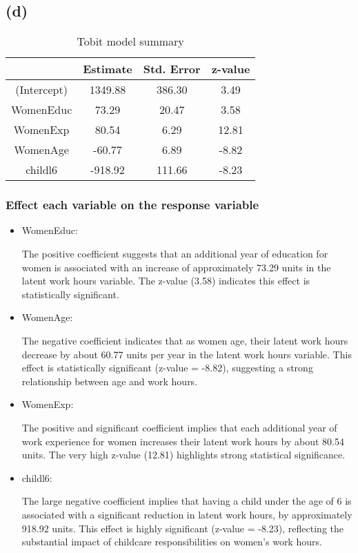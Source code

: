 \documentclass[a4paper]{article}
\begin{document}
\subsection*{(d)}

\begin{table}[h!]
    \centering
    \begin{tabular}{|cccc|}
    \hline
    \textbf{}   & \textbf{Estimate} & \textbf{Std. Error} & \textbf{z-value} \\ \hline
     (Intercept) &     1349.88    &     386.30      & 3.49      \\ %
     WomenEduc  &      73.29      &       20.47       & 3.58      \\ %
     WomenExp   &      80.54      &        6.29        & 12.81     \\ %
     WomenAge   &      -60.77     &       6.89       & -8.82     \\ %
     childl6    &       -918.92   &       111.66    & -8.23     \\ \hline
    \end{tabular}
    \caption{Tobit model summary}
    \label{tab:Tobit}
\end{table}

\subsubsection*{Effect each variable on the response variable}
\begin{itemize}
    \item WomenEduc: 
    
    The positive coefficient suggests that an additional year of education for women is associated with an increase of approximately 73.29 units in the latent work hours variable. The z-value (3.58) indicates this effect is statistically significant.

    \item WomenAge:

    The negative coefficient indicates that as women age, their latent work hours decrease by about 60.77 units per year in the latent work hours variable. This effect is statistically significant (z-value = -8.82), suggesting a strong relationship between age and work hours.

    \item WomenExp:
    
    The positive and significant coefficient implies that each additional year of work experience for women increases their latent work hours by about 80.54 units. The very high z-value (12.81) highlights strong statistical significance.

    \item childl6:
    
    The large negative coefficient implies that having a child under the age of 6 is associated with a significant reduction in latent work hours, by approximately 918.92 units. This effect is highly significant (z-value = -8.23), reflecting the substantial impact of childcare responsibilities on women's work hours.

\end{itemize}
\end{document}
